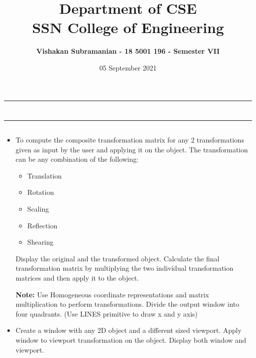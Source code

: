 \documentclass[12pt, a4]{article}
\title{\textbf{Department of CSE\\SSN College of Engineering}}
\author{\textbf{Vishakan Subramanian - 18 5001 196 - Semester VII}}
\date{05 September 2021}
\begin{document}
\maketitle
\hrule
\section*{}
\hrule
\bigskip

\subsection*{}
\subsection*{}
\begin{flushleft}

\begin{itemize}
\item To compute the composite transformation matrix for any 2 transformations given as input by the user and applying it on the object. The transformation can be any combination of the following:

	\begin{itemize}
	\item Translation
	\item Rotation
	\item Scaling
	\item Reflection
	\item Shearing 
	\end{itemize} 

Display the original and the transformed object.
Calculate the final transformation matrix by multiplying the two individual transformation matrices and then apply it to the object.

\textbf{Note:} Use Homogeneous coordinate representations and matrix multiplication to perform transformations. Divide the output window into four quadrants. (Use LINES primitive to draw x
and y axis)

\item Create a window with any 2D object and a different sized viewport. Apply window to viewport transformation on the object. Display both window and viewport. 

\end{itemize}
 
\end{flushleft}
\end{document}
